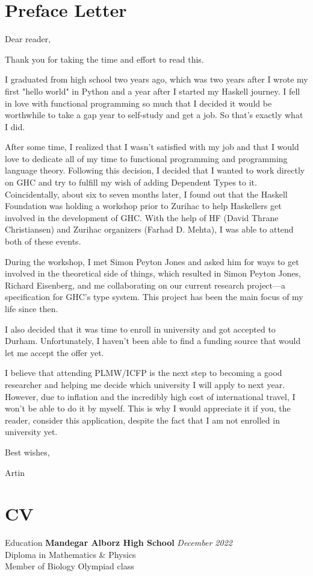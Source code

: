 \documentclass[
	a4paper,
	11pt,
]{resume}
\begin{document}
\section{Preface Letter}
Dear reader,

Thank you for taking the time and effort to read this.

I graduated from high school two years ago, which was two years after
I wrote my first "hello world" in Python and a year after I started my
Haskell journey. I fell in love with functional programming so much
that I decided it would be worthwhile to take a gap year to self-study
and get a job. So that's exactly what I did.

After some time, I realized that I wasn't satisfied with my job and
that I would love to dedicate all of my time to functional programming
and programming language theory. Following this decision, I decided
that I wanted to work directly on GHC and try to fulfill my wish of
adding Dependent Types to it. Coincidentally, about six to seven
months later, I found out that the Haskell Foundation was holding a
workshop prior to Zurihac to help Haskellers get involved in the
development of GHC. With the help of HF (David Thrane Christiansen)
and Zurihac organizers (Farhad D. Mehta), I was able to attend both of
these events.

During the workshop, I met Simon Peyton Jones and asked him for ways
to get involved in the theoretical side of things, which resulted in
Simon Peyton Jones, Richard Eisenberg, and me collaborating on our
current research project—a specification for GHC's type system. This
project has been the main focus of my life since then.

I also decided that it was time to enroll in university and got
accepted to Durham. Unfortunately, I haven't been able to find a
funding source that would let me accept the offer yet.

I believe that attending PLMW/ICFP is the next step to becoming a good
researcher and helping me decide which university I will apply to next
year. However, due to inflation and the incredibly high cost of
international travel, I won't be able to do it by myself. This is why
I would appreciate it if you, the reader, consider this application,
despite the fact that I am not enrolled in university yet.

Best wishes,

Artin

\newpage

\section{CV}
\begin{rSection}{Education}
	\textbf{Mandegar Alborz High School} \hfill \textit{December 2022} \\
	Diploma in Mathematics \& Physics \\
    Member of Biology Olympiad class \\
\end{rSection}
\end{document}
